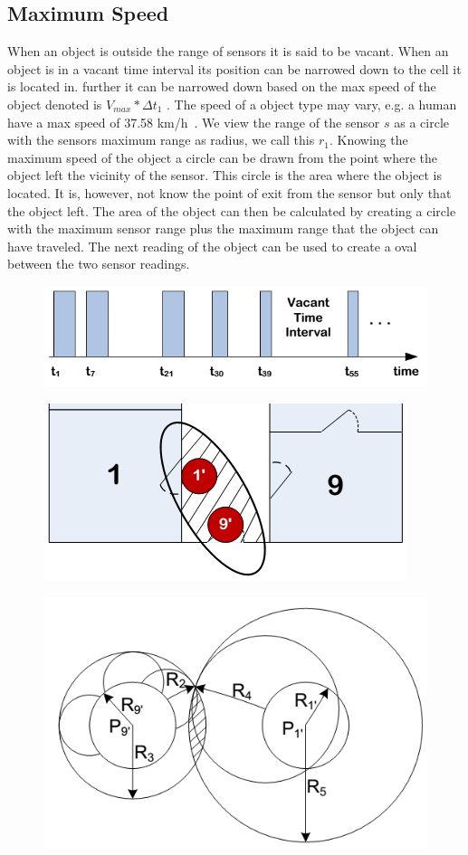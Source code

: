 \subsection{Maximum Speed}
\label{sec:speed}
When an object is outside the range of sensors it is said to be vacant.
When an object is in a vacant time interval its position can be narrowed down to the cell it is located in. 
further it can be narrowed down based on the max speed of the object denoted is $V_{max}*\Delta t_1$ . 
The speed of a object type may vary, e.g. a human have a max speed of 37.58 km/h~\cite{bolt}.
We view the range of the sensor $s$ as a circle with the sensors maximum range as radius, we call this $r_1$. 
Knowing the maximum speed of the object a circle can be drawn from the point where the object left the vicinity of the sensor.
This circle is the area where the object is located. 
It is, however, not know the point of exit from the sensor but only that the object left. 
The area of the object can then be calculated by creating a circle with the maximum sensor range plus the maximum range that the object can have traveled. 
The next reading of the object can be used to create a oval between the two sensor readings.  

\begin{figure}%
\includegraphics[width=\columnwidth]{images/vacant.png}%
\caption{}%
\label{fig:vacant}%
\end{figure}


\begin{figure}%
\includegraphics[width=0.8\columnwidth]{images/speed2.png}%
\caption{}%
\label{fig:speed2}%
\end{figure}




\begin{figure}%
\includegraphics[width=\columnwidth]{images/speed.png}%
\caption{}%
\label{}%
\end{figure}
